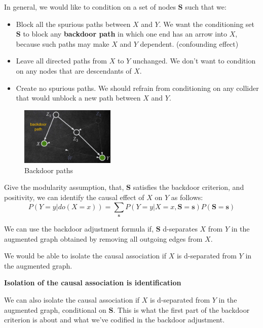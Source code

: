 In general, we would like to condition on a set of nodes $\mathbf{S}$ such that we:
\begin{itemize}
      \item Block all the spurious paths between $X$ and $Y$. We want the
            conditioning set $\mathbf{S}$ to block any \textbf{backdoor path} in
            which one end has an arrow into $X$, because such paths may make $X$
            and $Y$ dependent. (confounding effect)
      \item Leave all directed paths from $X$ to $Y$ unchanged. We don't want
            to condition on any nodes that are descendants of $X$.
      \item Create no spurious paths. We should refrain from conditioning on any
            collider that would unblock a new path between $X$ and $Y$.
\end{itemize}
\begin{figure}[!ht]
      \centering
      \includegraphics[width=0.4\textwidth]{img/causal_models/backdoor.png}
      \caption{Backdoor paths}
      \label{fig:backdoor}
\end{figure}
\begin{definition}
      Give the modularity assumption, that, $\mathbf{S}$ satisfies the backdoor
      criterion, and positivity, we can identify the causal effect of $X$ on $Y$
      as follows:
      \begin{equation}
            P(Y = y| do(X = x)) = \sum_{\mathbf{s}} P(Y = y| X = x, \mathbf{S} = \mathbf{s})P(\mathbf{S} = \mathbf{s})
      \end{equation}
\end{definition}

We can use the backdoor adjustment formula if, $\mathbf{S}$ d-separates $X$ from
$Y$ in the augmented graph obtained by removing all outgoing edges from $X$.

We would be able to isolate the causal association if $X$ is d-separated from
$Y$ in the augmented graph.
\begin{center}
      \textbf{Isolation of the causal association is identification}
\end{center}

We can also isolate the causal association if $X$ is d-separated from $Y$ in
the augmented graph, conditional on $\mathbf{S}$. This is what the first part of
the backdoor criterion is about and what we've codified in the backdoor adjustment.